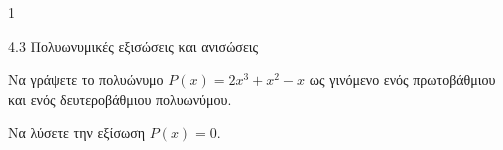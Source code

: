 \begin{ylh}{1}
\item 4.3 Πολυωνυμικές εξισώσεις και ανισώσεις
\end{ylh}
\begin{alist}
\item Να γράψετε το πολυώνυμο $P(x) = 2x^{3} + x^{2} - x$ ως γινόμενο ενός πρωτοβάθμιου και ενός δευτεροβάθμιου πολυωνύμου.
\item Να λύσετε την εξίσωση $P(x) = 0.$
\end{alist}

